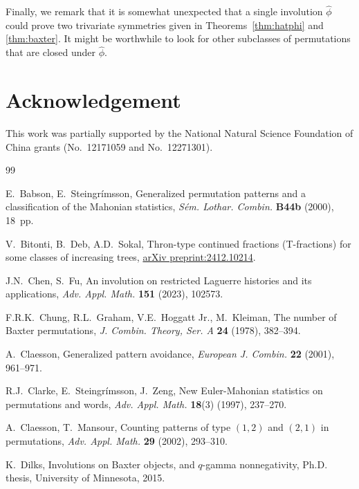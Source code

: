 \documentclass[12pt,reqno]{amsart}
\numberwithin{equation}{section}
\theoremstyle{plain}
\theoremstyle{definition}
\begin{document}
Finally, we remark that it is somewhat unexpected that a single involution $\widehat\phi$ could prove two trivariate symmetries given in Theorems~\ref{thm:hatphi} and \ref{thm:baxter}. It might be worthwhile to look for other subclasses of permutations that are closed under $\widehat\phi$.


\section*{Acknowledgement}
This work was partially supported by the National Natural Science Foundation of China grants (No.~12171059 and No.~12271301).









\begin{thebibliography}{99}

E.~Babson, E.~Steingr\'{i}msson, Generalized permutation patterns and a classification of the Mahonian statistics, {\it S\'{e}m. Lothar. Combin.} {\bf B44b} (2000), 18~pp.

V.~Bitonti, B.~Deb, A.D.~Sokal, Thron-type continued fractions (T-fractions) for some classes of increasing trees, \href{https://arxiv.org/abs/2412.10214}{arXiv preprint:2412.10214}.

J.N.~Chen, S.~Fu, An involution on restricted Laguerre histories and its applications, {\it Adv. Appl. Math.} {\bf151} (2023), 102573.

F.R.K.~Chung, R.L.~Graham, V.E.~Hoggatt Jr., M.~Kleiman, The number of Baxter permutations, {\it J. Combin. Theory, Ser. A} {\bf24} (1978), 382--394.

A.~Claesson, Generalized pattern avoidance, \textit{European J. Combin.} {\bf22} (2001), 961--971.

R.J.~Clarke, E.~Steingr\'{i}msson, J.~Zeng, New Euler-Mahonian statistics on permutations and words, {\it Adv. Appl. Math.} {\bf 18}(3) (1997), 237--270.

A.~Claesson, T.~Mansour, Counting patterns of type $(1,2)$ and $(2,1)$ in permutations, {\it Adv. Appl. Math.} {\bf29} (2002), 293--310. 

K.~Dilks, Involutions on Baxter objects, and $q$-gamma nonnegativity, Ph.D. thesis, University of Minnesota, 2015.


\end{thebibliography}
\end{document}
